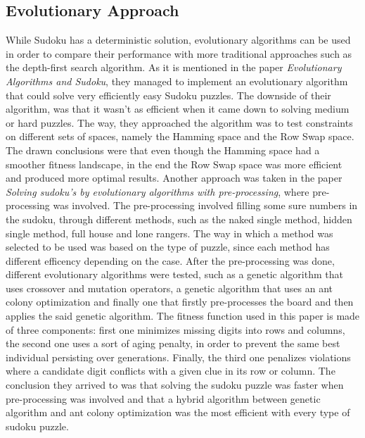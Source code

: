 \subsection{Evolutionary Approach}
{While Sudoku has a deterministic solution, evolutionary algorithms can be used in order to compare their performance with more traditional approaches such as the depth-first search algorithm. As it is mentioned in the paper \textit{Evolutionary Algorithms and Sudoku}, they managed to implement an evolutionary algorithm that could solve very efficiently easy Sudoku puzzles\cite{Moraglio}. The downside of their algorithm, was that it wasn't as efficient when it came down to solving medium or hard puzzles.
The way, they approached the algorithm was to test constraints on different sets of spaces, namely the Hamming space and the Row Swap space. The drawn conclusions were that even though the Hamming space had a smoother fitness landscape, in the end the Row Swap space was more efficient and produced more optimal results.}
{\newline}
{\newline Another approach was taken in the paper \textit{Solving sudoku’s by evolutionary algorithms with pre-processing}, where pre-processing was involved\cite{Amil2019}. The pre-processing involved filling some sure numbers in the sudoku, through different methods, such as the naked single method, hidden single method, full house and lone rangers. The way in which a method was selected to be used was based on the type of puzzle, since each method has different efficency depending on the case.
After the pre-processing was done, different evolutionary algorithms were tested, such as a genetic algorithm that uses crossover and mutation operators, a genetic algorithm that uses an ant colony optimization and finally one that firstly pre-processes the board and then applies the said genetic algorithm. The fitness function used in this paper is made of three components: first one minimizes missing digits into rows and columns, the second one uses a sort of aging penalty, in order to prevent the same best individual persisting over generations. Finally, the third one penalizes violations where a candidate digit conflicts with a given clue in its row or column.
The conclusion they arrived to was that solving the sudoku puzzle was faster when pre-processing was involved and that a hybrid algorithm between genetic algorithm and ant colony optimization was the most efficient with every type of sudoku puzzle.  }
{\newline}
